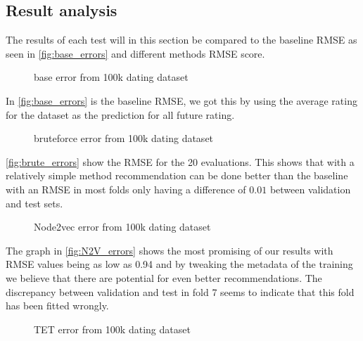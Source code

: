 \subsection{Result analysis}
The results of each test will in this section be compared to the baseline RMSE as seen in \autoref{fig:base_errors} and different methods RMSE score.

\begin{figure}[H]
	\centering
	\begin{adjustbox}{width=0.5\textwidth}
		
	\end{adjustbox}
	\caption{base error from 100k dating dataset }
	\label{fig:base_errors}
\end{figure}

In \autoref{fig:base_errors} is the baseline RMSE, we got this by using the average rating for the dataset as the prediction for all future rating.

\begin{figure}[H]
	\centering
	\begin{adjustbox}{width=0.5\textwidth}
		
	\end{adjustbox}
	\caption{bruteforce error from 100k dating dataset }
	\label{fig:brute_errors}
\end{figure}

\autoref{fig:brute_errors} show the RMSE for the 20 evaluations. This shows that with a relatively simple method recommendation can be done better than the baseline with an RMSE in most folds only having a difference of $0.01$ between validation and test sets.

\begin{figure}[H]
	\centering
	\begin{adjustbox}{width=0.5\textwidth}
		
	\end{adjustbox}
	\caption{Node2vec error from 100k dating dataset}
	\label{fig:N2V_errors}
\end{figure}

The graph in \autoref{fig:N2V_errors} shows the most promising of our results with RMSE values being as low as 0.94 and by tweaking the metadata of the training we believe that there are potential for even better recommendations.
The discrepancy between validation and test in fold 7 seems to indicate that this fold has been fitted wrongly.


\begin{figure}[H]
	\centering
	\begin{adjustbox}{width=0.5\textwidth}
		
	\end{adjustbox}
	\caption{TET error from 100k dating dataset }
	\label{fig:tet_errors}
\end{figure}



